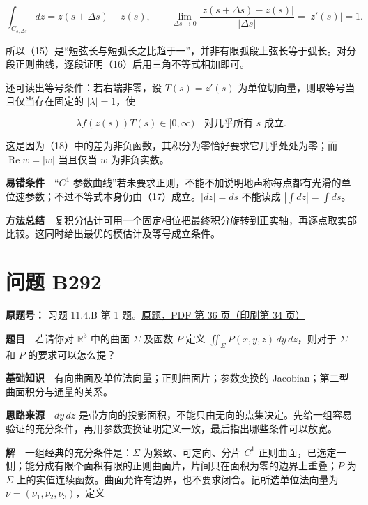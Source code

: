 \documentclass[11pt,a4paper]{article}
\begin{document}
\begin{equation}
\int_{C_{s,\Delta s}}dz=z(s+\Delta s)-z(s),\qquad
\lim_{\Delta s\to0}\frac{|z(s+\Delta s)-z(s)|}{|\Delta s|}
=|z'(s)|=1.
\tag{19}
\end{equation}

所以（15）是``短弦长与短弧长之比趋于一''，并非有限弧段上弦长等于弧长。对分段正则曲线，逐段证明（16）后用三角不等式相加即可。

还可读出等号条件：若右端非零，设 \(T(s)=z'(s)\)
为单位切向量，则取等号当且仅当存在固定的 \(|\lambda|=1\)，使

\begin{equation}
\lambda f(z(s))T(s)\in[0,\infty)
\quad\text{对几乎所有 }s\text{ 成立}.
\tag{20}
\end{equation}

这是因为（18）中的差为非负函数，其积分为零恰好要求它几乎处处为零；而
\(\operatorname{Re}w=|w|\) 当且仅当 \(w\) 为非负实数。

\textbf{易错条件}　``\(C^1\)
参数曲线''若未要求正则，不能不加说明地声称每点都有光滑的单位速参数；不过不等式本身仍由（17）成立。\(|dz|=ds\)
不能读成 \(|\int dz|=\int ds\)。

\textbf{方法总结}　复积分估计可用一个固定相位把最终积分旋转到正实轴，再逐点取实部比较。这同时给出最优的模估计及等号成立条件。

\section{问题 B292}\label{ux95eeux9898-b292}

\textbf{原题号：} 习题 11.4.B 第 1
题。\href{https://zj139.github.io/math-notes/files/problems/楼分析习题-v2.pdf\#page=36}{原题，PDF
第 36 页（印刷第 34 页）}

\textbf{题目}　若请你对 \(\mathbb R^3\) 中的曲面 \(\Sigma\) 及函数 \(P\)
定义 \(\iint_\Sigma P(x,y,z)\,dy\,dz\)，则对于 \(\Sigma\) 和 \(P\)
的要求可以怎么提？

\textbf{基础知识}　有向曲面及单位法向量；正则曲面片；参数变换的
Jacobian；第二型曲面积分与通量的关系。

\textbf{思路来源}　\(dy\,dz\)
是带方向的投影面积，不能只由无向的点集决定。先给一组容易验证的充分条件，再用参数变换证明定义一致，最后指出哪些条件可以放宽。

\textbf{解}　一组经典的充分条件是：\(\Sigma\) 为紧致、可定向、分片
\(C^1\)
正则曲面，已选定一侧；能分成有限个面积有限的正则曲面片，片间只在面积为零的边界上重叠；\(P\)
为 \(\Sigma\)
上的实值连续函数。曲面允许有边界，也不要求闭合。记所选单位法向量为
\(\nu=(\nu_1,\nu_2,\nu_3)\)，定义
\end{document}
